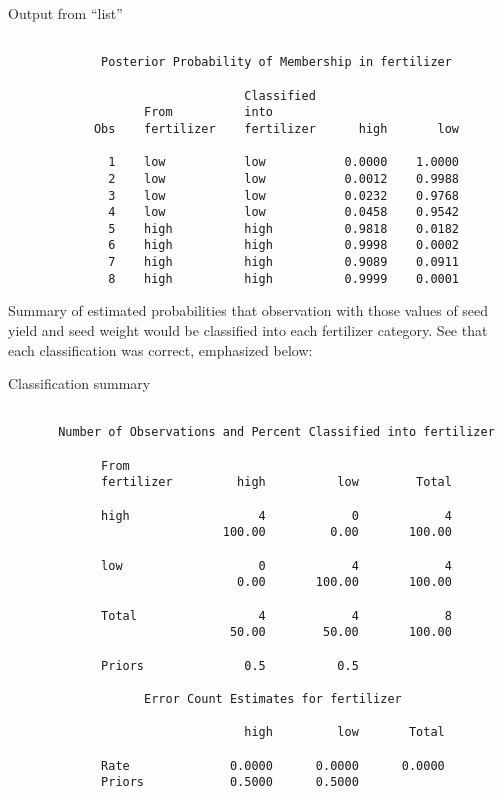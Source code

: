 \documentclass[pdf]{prosper}
\begin{document}
\begin{slide}{Output from ``list''}

{\scriptsize
\begin{verbatim}

             Posterior Probability of Membership in fertilizer
 
                                 Classified
                   From          into
            Obs    fertilizer    fertilizer      high       low

              1    low           low           0.0000    1.0000
              2    low           low           0.0012    0.9988
              3    low           low           0.0232    0.9768
              4    low           low           0.0458    0.9542
              5    high          high          0.9818    0.0182
              6    high          high          0.9998    0.0002
              7    high          high          0.9089    0.0911
              8    high          high          0.9999    0.0001

\end{verbatim}
}

Summary of estimated probabilities that observation with those values of seed yield and seed weight would be classified into each fertilizer category. See that each classification was correct, emphasized below:


\end{slide}
\begin{slide}{Classification summary}

{\scriptsize
\begin{verbatim}

       Number of Observations and Percent Classified into fertilizer
 
             From
             fertilizer         high          low        Total

             high                  4            0            4
                              100.00         0.00       100.00

             low                   0            4            4
                                0.00       100.00       100.00

             Total                 4            4            8
                               50.00        50.00       100.00

             Priors              0.5          0.5             

                   Error Count Estimates for fertilizer
 
                                 high         low       Total

             Rate              0.0000      0.0000      0.0000
             Priors            0.5000      0.5000            
\end{verbatim}
}

\end{slide}
\end{document}

